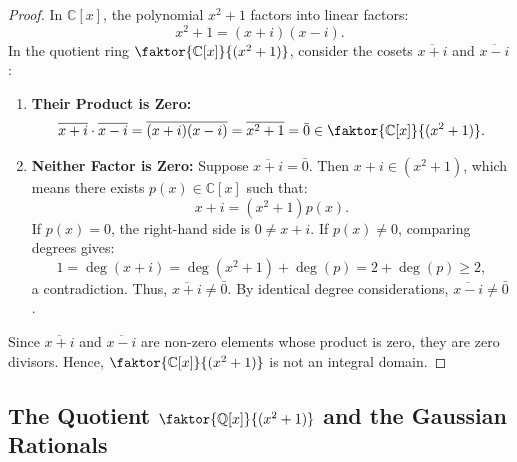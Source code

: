 \begin{content}

\begin{proof}
In $\mathbb{C}[x]$, the polynomial $x^2 + 1$ factors into linear factors:
\[
x^2 + 1 = (x + i)(x - i).
\]
In the quotient ring $\faktor{\mathbb{C}[x]}{(x^2 + 1)}$, consider the cosets $\overline{x + i}$ and $\overline{x - i}$:
\begin{enumerate}[label=\textbf{(\arabic*)}]
    \item \textbf{Their Product is Zero:}
    \[
    \overline{x + i} \cdot \overline{x - i} = \overline{(x + i)(x - i)} = \overline{x^2 + 1} = \bar{0} \in \faktor{\mathbb{C}[x]}{(x^2 + 1)}.
    \]
    \item \textbf{Neither Factor is Zero:}
    Suppose $\overline{x + i} = \bar{0}$. Then $x + i \in (x^2 + 1)$, which means there exists $p(x) \in \mathbb{C}[x]$ such that:
    \[
    x + i = (x^2 + 1) p(x).
    \]
    If $p(x) = 0$, the right-hand side is $0 \neq x + i$. If $p(x) \neq 0$, comparing degrees gives:
    \[
    1 = \deg(x + i) = \deg(x^2 + 1) + \deg(p) = 2 + \deg(p) \ge 2,
    \]
    a contradiction. Thus, $\overline{x + i} \neq \bar{0}$. By identical degree considerations, $\overline{x - i} \neq \bar{0}$.
\end{enumerate}
Since $\overline{x + i}$ and $\overline{x - i}$ are non-zero elements whose product is zero, they are zero divisors. Hence, $\faktor{\mathbb{C}[x]}{(x^2 + 1)}$ is not an integral domain.
\end{proof}
\end{content}

\subsection{The Quotient \texorpdfstring{$\faktor{\mathbb{Q}[x]}{(x^2+1)}$}{Q[x]/(x\texttwosuperior+1)} and the Gaussian Rationals}

